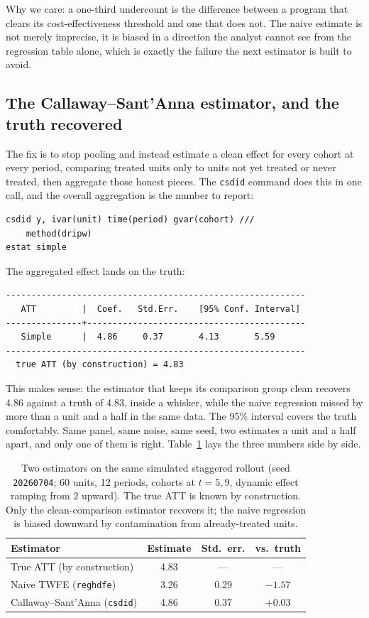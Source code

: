 \documentclass[
    a4paper,
    fontsize=10pt,
    twoside=true,
    numbers=noenddot,
]{kaobook}
\begin{document}
Why we care: a one-third undercount is the difference between a program that clears its cost-effectiveness threshold and one that does not. The naive estimate is not merely imprecise, it is biased in a direction the analyst cannot see from the regression table alone, which is exactly the failure the next estimator is built to avoid.

\subsection{The Callaway--Sant'Anna estimator, and the truth recovered}
The fix is to stop pooling and instead estimate a clean effect for every cohort at every period, comparing treated units only to units not yet treated or never treated, then aggregate those honest pieces. The \texttt{csdid} command does this in one call, and the overall aggregation is the number to report:
{\footnotesize
\begin{verbatim}
csdid y, ivar(unit) time(period) gvar(cohort) ///
    method(dripw)
estat simple
\end{verbatim}
}
The aggregated effect lands on the truth:
{\footnotesize
\begin{verbatim}
-----------------------------------------------------------
   ATT         |  Coef.   Std.Err.    [95% Conf. Interval]
---------------+-------------------------------------------
   Simple      |  4.86     0.37       4.13       5.59
-----------------------------------------------------------
  true ATT (by construction) = 4.83
\end{verbatim}
}
This makes sense: the estimator that keeps its comparison group clean recovers 4.86 against a truth of 4.83, inside a whisker, while the naive regression missed by more than a unit and a half in the same data. The 95\% interval covers the truth comfortably. Same panel, same noise, same seed, two estimates a unit and a half apart, and only one of them is right. Table~\ref{tab:did-compare} lays the three numbers side by side.

\begin{table}[htbp]
\centering
\caption[TWFE vs.\ Callaway--Sant'Anna on a known truth]{Two estimators on the same simulated staggered rollout (seed \texttt{20260704}; 60 units, 12 periods, cohorts at $t{=}5,9$, dynamic effect ramping from 2 upward). The true ATT is known by construction. Only the clean-comparison estimator recovers it; the naive regression is biased downward by contamination from already-treated units.}
\label{tab:did-compare}
{\footnotesize
\begin{tabular}{lccc}
\hline
Estimator & Estimate & Std.\ err. & vs.\ truth \\
\hline
True ATT (by construction) & 4.83 & --- & --- \\
Naive TWFE (\texttt{reghdfe}) & 3.26 & 0.29 & $-1.57$ \\
Callaway--Sant'Anna (\texttt{csdid}) & 4.86 & 0.37 & $+0.03$ \\
\hline
\end{tabular}
}
\end{table}
\end{document}
